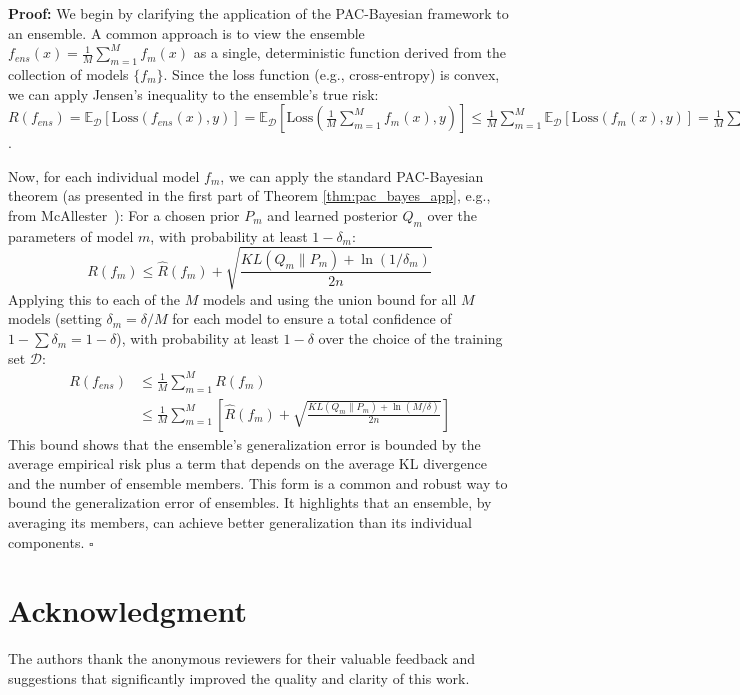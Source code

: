 \documentclass[journal]{IEEEtran}
\newcounter{theorem}
\newenvironment{proof}{\par\medskip\noindent \textbf{Proof:} \rmfamily}{\hfill$\square$\medskip}
\begin{document}
\begin{proof}
We begin by clarifying the application of the PAC-Bayesian framework to an ensemble. A common approach is to view the ensemble $f_{ens}(x) = \frac{1}{M} \sum_{m=1}^M f_m(x)$ as a single, deterministic function derived from the collection of models $\{f_m\}$. Since the loss function (e.g., cross-entropy) is convex, we can apply Jensen's inequality to the ensemble's true risk:
$R(f_{ens}) = \mathbb{E}_{\mathcal{D}}[\text{Loss}(f_{ens}(x), y)] = \mathbb{E}_{\mathcal{D}}[\text{Loss}(\frac{1}{M}\sum_{m=1}^M f_m(x), y)] \le \frac{1}{M}\sum_{m=1}^M \mathbb{E}_{\mathcal{D}}[\text{Loss}(f_m(x), y)] = \frac{1}{M}\sum_{m=1}^M R(f_m)$.

Now, for each individual model $f_m$, we can apply the standard PAC-Bayesian theorem (as presented in the first part of Theorem \ref{thm:pac_bayes_app}, e.g., from McAllester~\cite{mcallester1999pac_original}): For a chosen prior $P_m$ and learned posterior $Q_m$ over the parameters of model $m$, with probability at least $1-\delta_m$:
\begin{equation}
R(f_m) \leq \hat{R}(f_m) + \sqrt{\frac{KL(Q_m \| P_m) + \ln(1/\delta_m)}{2n}}
\end{equation}
Applying this to each of the $M$ models and using the union bound for all $M$ models (setting $\delta_m = \delta/M$ for each model to ensure a total confidence of $1-\sum \delta_m = 1-\delta$), with probability at least $1-\delta$ over the choice of the training set $\mathcal{D}$:
\begin{align*}
R(f_{ens}) &\leq \frac{1}{M}\sum_{m=1}^M R(f_m) \\
&\leq \frac{1}{M}\sum_{m=1}^M \left[ \hat{R}(f_m) + \sqrt{\frac{KL(Q_m \| P_m) + \ln(M/\delta)}{2n}} \right]
\end{align*}
This bound shows that the ensemble's generalization error is bounded by the average empirical risk plus a term that depends on the average KL divergence and the number of ensemble members. This form is a common and robust way to bound the generalization error of ensembles. It highlights that an ensemble, by averaging its members, can achieve better generalization than its individual components.
\end{proof}

\section*{Acknowledgment}

The authors thank the anonymous reviewers for their valuable feedback and suggestions that significantly improved the quality and clarity of this work.



\end{document}
